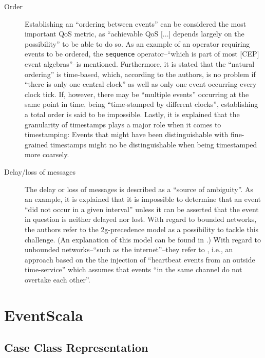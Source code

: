 \documentclass[article, type=bsc, colorback, accentcolor=tud8b, parskip=half, bibliography=totocnumbered]{tudthesis}
\begin{document}
\begin{description}

\item[Order]
Establishing an ``ordering between events'' can be considered the most important QoS metric, as ``achievable QoS [...] depends largely on the possibility'' to be able to do so.
As an example of an operator requiring events to be ordered, the \lstinline{sequence} operator--``which is part of most [CEP] event algebras''--is mentioned.
Furthermore, it is stated that the ``natural ordering'' is time-based, which, according to the authors, is no problem if ``there is only one central clock'' as well as only one event occurring every clock tick.
If, however, there may be ``multiple events'' occurring at the same point in time, being ``time-stamped by different clocks'', establishing a total order is said to be impossible.
Lastly, it is explained that the granularity of timestamps plays a major role when it comes to timestamping:
Events that might have been distinguishable with fine-grained timestamps might no be distinguishable when being timestamped more coarsely.

\item[Delay/loss of messages]
The delay or loss of messages is described as a ``source of ambiguity''.
As an example, it is explained that it is impossible to determine that an event ``did not occur in a given interval'' unless it can be asserted that the event in question is neither delayed nor lost.
With regard to bounded networks, the authors refer to the 2g-precedence model as a possibility to tackle this challenge.
(An explanation of this model can be found in \cite{792159}.)
With regard to unbounded networks--``such as the internet''--they refer to \cite{792159}, i.e., an approach based on the the injection of ``heartbeat events from an outside time-service'' which assumes that events ``in the same channel do not overtake each other''.

\end{description}

\newpage

\section{EventScala}
\label{sec:eventscala}


\subsection{Case Class Representation}
\label{sec:case_class_rep}
\end{document}
